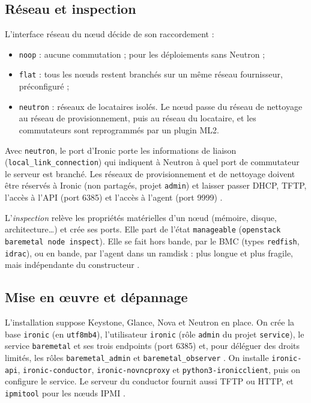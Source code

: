\subsection{Réseau et inspection}\label{sec:ir-reseau}

L'interface réseau du nœud décide de son raccordement \parencite{ironic-networking} :

\begin{itemize}
  \item \texttt{noop} : aucune commutation ; pour les déploiements sans Neutron ;
  \item \texttt{flat} : tous les nœuds restent branchés sur un même réseau fournisseur, préconfiguré ;
  \item \texttt{neutron} : réseaux de locataires isolés. Le nœud passe du réseau de nettoyage au réseau de provisionnement,
        puis au réseau du locataire, et les commutateurs sont reprogrammés par un plugin ML2.
\end{itemize}

Avec \texttt{neutron}, le port d'Ironic porte les informations de liaison (\texttt{local\_\allowbreak link\_\allowbreak connection}) qui
indiquent à Neutron à quel port de commutateur le serveur est branché. Les réseaux de provisionnement et de nettoyage doivent
être réservés à Ironic (non partagés, projet \texttt{admin}) et laisser passer DHCP, TFTP, l'accès à l'API (port 6385) et
l'accès à l'agent (port 9999) \parencite{ironic-networking,ironic-tenant-networks}.

L'\emph{inspection} relève les propriétés matérielles d'un nœud (mémoire, disque, architecture\dots) et crée ses ports. Elle
part de l'état \texttt{manageable} (\texttt{openstack baremetal node inspect}). Elle se fait hors bande, par le BMC (types
\texttt{redfish}, \texttt{idrac}), ou en bande, par l'agent dans un ramdisk : plus longue et plus fragile, mais indépendante du constructeur
\parencite{ironic-inspection}.

\subsection{Mise en œuvre et dépannage}\label{sec:ir-deploiement}

L'installation suppose Keystone, Glance, Nova et Neutron en place. On crée la base \texttt{ironic} (en \texttt{utf8mb4}),
l'utilisateur \texttt{ironic} (rôle \texttt{admin} du projet \texttt{service}), le service \texttt{baremetal} et ses trois
endpoints (port 6385) et, pour déléguer des droits limités, les rôles \texttt{baremetal\_\allowbreak admin} et
\texttt{baremetal\_\allowbreak observer} \parencite{ironic-identity,ironic-install}. On installe \texttt{ironic-api},
\texttt{ironic-conductor}, \texttt{ironic-novncproxy} et \texttt{python3-ironicclient}, puis on configure le service. Le
serveur du conductor fournit aussi TFTP ou HTTP, et \texttt{ipmitool} pour les nœuds IPMI \parencite{ironic-pxe,ironic-ipmi}.

